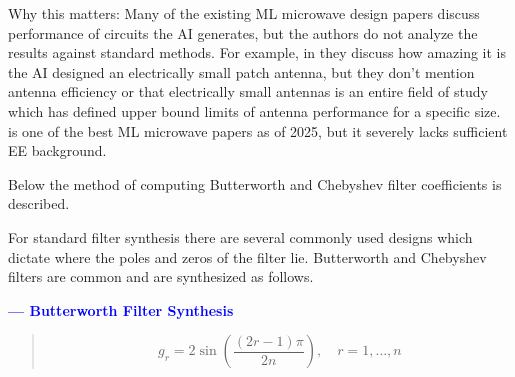 \documentclass[10pt,conference]{IEEEtran}
\begin{document}
Why this matters: Many of the existing ML microwave design papers discuss performance of circuits the AI generates, but the authors do not analyze the results against standard methods. For example, in \cite{karahan2024rfdesign} they discuss how amazing it is the AI designed an electrically small patch antenna, but they don't mention antenna efficiency or that electrically small antennas is an entire field of study which has defined upper bound limits of antenna performance for a specific size. \cite{karahan2024rfdesign} is one of the best ML microwave papers as of 2025, but it severely lacks sufficient EE background.

Below the method of computing Butterworth and Chebyshev filter coefficients is described.



For standard filter synthesis there are several commonly used designs which dictate where the poles and zeros of the filter lie. Butterworth and Chebyshev filters are common and are synthesized as follows.



\textcolor{blue}{ \textbf{ --- Butterworth Filter Synthesis} }
\begin{quote}
	\begin{equation}\label{eq:gr_sine}
	g_r = 2 \sin\left( \frac{(2r - 1)\pi}{2n} \right), \quad r = 1, \ldots, n
	\end{equation}
\end{quote}

$~$
$~$
\end{document}
